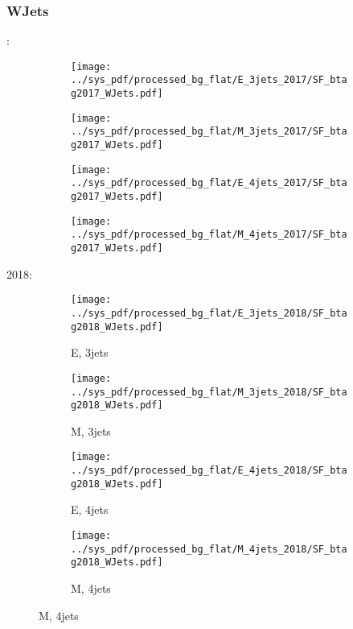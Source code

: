 \documentclass{beamer}
\begin{document}
\begin{frame}
\frametitle{WJets}
\fontsize{5}{1}:
\begin{figure}
\centering
\begin{subfigure}[b]{0.24\textwidth}
\texttt{[image: ../sys\_pdf/processed\_bg\_flat/E\_3jets\_2017/SF\_btag2017\_WJets.pdf]}
\end{subfigure}
\begin{subfigure}[b]{0.24\textwidth}
\texttt{[image: ../sys\_pdf/processed\_bg\_flat/M\_3jets\_2017/SF\_btag2017\_WJets.pdf]}
\end{subfigure}
\begin{subfigure}[b]{0.24\textwidth}
\texttt{[image: ../sys\_pdf/processed\_bg\_flat/E\_4jets\_2017/SF\_btag2017\_WJets.pdf]}
\end{subfigure}
\begin{subfigure}[b]{0.24\textwidth}
\texttt{[image: ../sys\_pdf/processed\_bg\_flat/M\_4jets\_2017/SF\_btag2017\_WJets.pdf]}
\end{subfigure}
\end{figure}
2018:
\begin{figure}
\centering
\begin{subfigure}[b]{0.24\textwidth}
\texttt{[image: ../sys\_pdf/processed\_bg\_flat/E\_3jets\_2018/SF\_btag2018\_WJets.pdf]}
\captionsetup{font=tiny}
\caption{E, 3jets}
\end{subfigure}
\begin{subfigure}[b]{0.24\textwidth}
\texttt{[image: ../sys\_pdf/processed\_bg\_flat/M\_3jets\_2018/SF\_btag2018\_WJets.pdf]}
\captionsetup{font=tiny}
\caption{M, 3jets}
\end{subfigure}
\begin{subfigure}[b]{0.24\textwidth}
\texttt{[image: ../sys\_pdf/processed\_bg\_flat/E\_4jets\_2018/SF\_btag2018\_WJets.pdf]}
\captionsetup{font=tiny}
\caption{E, 4jets}
\end{subfigure}
\begin{subfigure}[b]{0.24\textwidth}
\texttt{[image: ../sys\_pdf/processed\_bg\_flat/M\_4jets\_2018/SF\_btag2018\_WJets.pdf]}
\captionsetup{font=tiny}
\caption{M, 4jets}
\end{subfigure}
\end{figure}
\end{frame}
\end{document}
